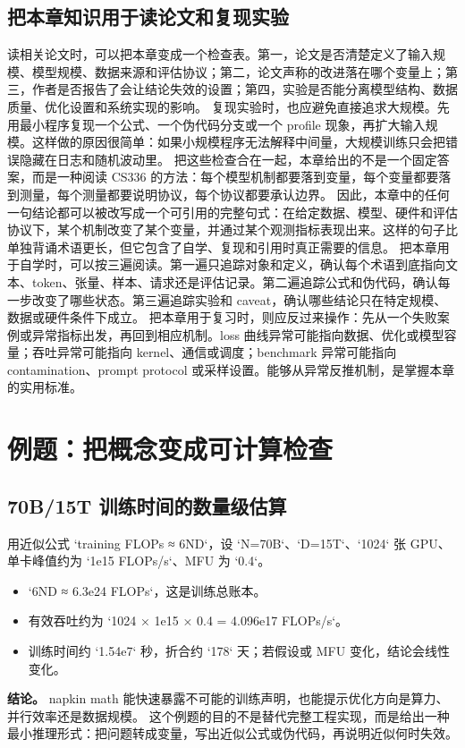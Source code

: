 \documentclass[a4paper]{article}
\begin{document}
\subsection{把本章知识用于读论文和复现实验}
读相关论文时，可以把本章变成一个检查表。第一，论文是否清楚定义了输入规模、模型规模、数据来源和评估协议；第二，论文声称的改进落在哪个变量上；第三，作者是否报告了会让结论失效的设置；第四，实验是否能分离模型结构、数据质量、优化设置和系统实现的影响。
复现实验时，也应避免直接追求大规模。先用最小程序复现一个公式、一个伪代码分支或一个 profile 现象，再扩大输入规模。这样做的原因很简单：如果小规模程序无法解释中间量，大规模训练只会把错误隐藏在日志和随机波动里。
把这些检查合在一起，本章给出的不是一个固定答案，而是一种阅读 CS336 的方法：每个模型机制都要落到变量，每个变量都要落到测量，每个测量都要说明协议，每个协议都要承认边界。
因此，本章中的任何一句结论都可以被改写成一个可引用的完整句式：在给定数据、模型、硬件和评估协议下，某个机制改变了某个变量，并通过某个观测指标表现出来。这样的句子比单独背诵术语更长，但它包含了自学、复现和引用时真正需要的信息。
把本章用于自学时，可以按三遍阅读。第一遍只追踪对象和定义，确认每个术语到底指向文本、token、张量、样本、请求还是评估记录。第二遍追踪公式和伪代码，确认每一步改变了哪些状态。第三遍追踪实验和 caveat，确认哪些结论只在特定规模、数据或硬件条件下成立。
把本章用于复习时，则应反过来操作：先从一个失败案例或异常指标出发，再回到相应机制。loss 曲线异常可能指向数据、优化或模型容量；吞吐异常可能指向 kernel、通信或调度；benchmark 异常可能指向 contamination、prompt protocol 或采样设置。能够从异常反推机制，是掌握本章的实用标准。
\section{例题：把概念变成可计算检查}
\subsection{70B/15T 训练时间的数量级估算}
用近似公式 `training FLOPs ≈ 6ND`，设 `N=70B`、`D=15T`、`1024` 张 GPU、单卡峰值约为 `1e15 FLOPs/s`、MFU 为 `0.4`。
\begin{itemize}
\item `6ND ≈ 6.3e24 FLOPs`，这是训练总账本。
\item 有效吞吐约为 `1024 × 1e15 × 0.4 = 4.096e17 FLOPs/s`。
\item 训练时间约 `1.54e7` 秒，折合约 `178` 天；若假设或 MFU 变化，结论会线性变化。
\end{itemize}
\textbf{结论。} napkin math 能快速暴露不可能的训练声明，也能提示优化方向是算力、并行效率还是数据规模。
这个例题的目的不是替代完整工程实现，而是给出一种最小推理形式：把问题转成变量，写出近似公式或伪代码，再说明近似何时失效。
\end{document}

